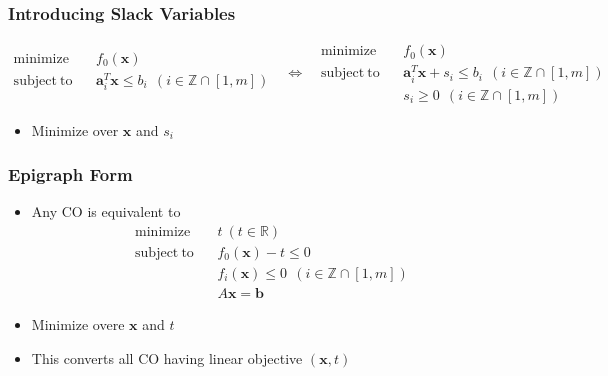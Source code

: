 \subsubsection*{Introducing Slack Variables}
$$ \begin{aligned}
    \mathrm{minimize}~~&~~f_0(\mathbf{x}) \\
    \mathrm{subject~to}~~&~~\mathbf{a}_i^T \mathbf{x} \leq b_i~~(i \in \mathbb{Z} \cap [1,m]) \\ {}
\end{aligned}~~~\Leftrightarrow~~~\begin{aligned}
    \mathrm{minimize}~~&~~f_0(\mathbf{x}) \\
    \mathrm{subject~to}~~&~~\mathbf{a}_i^T \mathbf{x} + s_i \leq b_i~~(i \in \mathbb{Z} \cap [1,m]) \\
        &~~ s_i \geq 0~~(i \in \mathbb{Z} \cap [1,m])
\end{aligned} $$
\begin{itemize}
    \item Minimize over $\mathbf{x}$ and $s_i$
\end{itemize}

\subsubsection*{Epigraph Form}
\begin{itemize}
    \item Any CO is equivalent to
        $$ \begin{aligned}
            \mathrm{minimize}~~&~~t~(t \in \mathbb{R}) \\
            \mathrm{subject~to}~~&~~f_0(\mathbf{x}) - t \leq 0 \\
                &~~f_i(\mathbf{x}) \leq 0~~(i \in \mathbb{Z} \cap [1,m]) \\
                &~~ A\mathbf{x} = \mathbf{b}
        \end{aligned} $$
    \item Minimize overe $\mathbf{x}$ and $t$
    \item This converts all CO having linear objective $(\mathbf{x}, t)$
\end{itemize}

